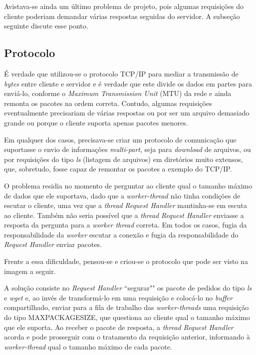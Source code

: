 \documentclass[12pt]{article}
\begin{document}
Avistava-se ainda um último problema de projeto, pois algumas requisições do cliente poderiam demandar várias respostas seguidas do servidor. A subseção seguinte discute esse ponto.

\subsection{Protocolo}

É verdade que utilizou-se o protocolo TCP/IP para mediar a transmissão de \textit{bytes} entre cliente e servidor e é verdade que este divide os dados em partes para enviá-lo, conforme o \textit{Maximum Transmission Unit} (MTU) da rede e ainda remonta os pacotes na ordem correta. Contudo, algumas requisições eventualmente precisariam de várias respostas ou por ser um arquivo demasiado grande ou porque o cliente suporta apenas pacotes menores.

Em qualquer dos casos, precisava-se criar um protocolo de comunicação que suportasse o envio de informações \textit{multi-part}, seja para \textit{download} de arquivos, ou por requisições do tipo \emph{ls} (listagem de arquivos) em diretórios muito extensos, que, sobretudo, fosse capaz de remontar os pacotes a exemplo do TCP/IP.

O problema residia no momento de perguntar ao cliente qual o tamanho máximo de dados que ele suportava, dado que a \textit{worker-thread} não tinha condições de escutar o cliente, uma vez que a \textit{thread} \textit{Request Handler} mantinha-se em escuta ao cliente. Também não seria possível que a \textit{thread} \textit{Request Handler} enviasse a resposta da pergunta para a \textit{worker thread} correta. Em todos os casos, fugia da responsabilidade da \textit{worker} escutar a conexão e fugia da responsabilidade do \textit{Request Handler} enviar pacotes.

Frente a essa dificuldade, pensou-se e criou-se o protocolo que pode ser visto na imagem a seguir.

A solução consiste no \textit{Request Handler} ``segurar"" os pacote de pedidos do tipo \emph{ls} e \emph{wget} e, ao invés de transformá-lo em uma requisição e colocá-lo no \textit{buffer} compartilhado, enviar para a fila de trabalho das \textit{worker-threads} uma requisição do tipo MAXPACKAGESIZE, que questiona ao cliente qual o tamanho máximo que ele suporta. Ao receber o pacote de resposta, a \textit{thread} \textit{Request Handler} acorda e pode prosseguir com o tratamento da requisição anterior, informando à \textit{worker-thread} qual o tamanho máximo de cada pacote.
\end{document}
